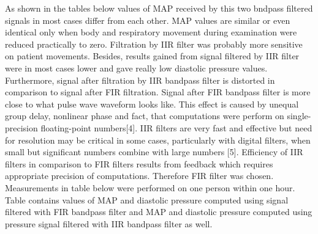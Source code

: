 As shown in the tables below values of M\+AP received by this two bndpass filtered signals in most cases differ from each other. M\+AP values are similar or even identical only when body and respiratory movement during examination were reduced practically to zero. Filtration by I\+IR filter was probably more sensitive on patient movements. Besides, results gained from signal filtered by I\+IR filter were in most cases lower and gave really low diastolic pressure values. Furthermore, signal after filtration by I\+IR bandpass filter is distorted in comparison to signal after F\+IR filtration. Signal after F\+IR bandpass filter is more close to what pulse wave waveform looks like. This effect is caused by unequal group delay, nonlinear phase and fact, that computations were perform on single-\/precision floating-\/point numbers\mbox{[}4\mbox{]}. I\+IR filters are very fast and effective but need for resolution may be critical in some cases, particularly with digital filters, when small but significant numbers combine with large numbers \mbox{[}5\mbox{]}. Efficiency of I\+IR filters in comparison to F\+IR filters results from feedback which requires appropriate precision of computations. Therefore F\+IR filter was chosen. Measurements in table below were performed on one person within one hour. Table contains values of M\+AP and diastolic pressure computed using signal filtered with F\+IR bandpass filter and M\+AP and diastolic pressure computed using pressure signal filtered with I\+IR bandpass filter as well.

